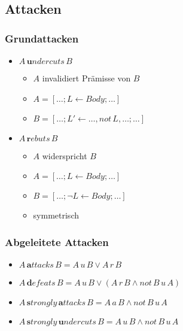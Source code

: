 \documentclass[nonacm=true, language=german]{acmart}
\newcommand{\attack}[3]{#1 \, #2 \, #3}
\renewcommand{\not}[1]{not \, #1}
\begin{document}
\subsection{Attacken}

\subsubsection{Grundattacken}

\begin{itemize}
    \item $ \attack{A}{\mathbf{u}ndercuts}{B} $
    \begin{itemize}
        \item $A$ invalidiert Prämisse von $B$
        \item $ A = [\dots; L \leftarrow Body; \dots] $
        \item $ B = [\dots; L' \leftarrow \dots, \not{L}, \dots; \dots] $
    \end{itemize}
    
    \item $ \attack{A}{\mathbf{r}ebuts}{B} $
    \begin{itemize}
        \item $A$ widerspricht $B$
        \item $ A = [\dots; L \leftarrow Body; \dots] $
        \item $ B = [\dots; \neg L \leftarrow Body; \dots] $
        \item symmetrisch
    \end{itemize}
\end{itemize}

\subsubsection{Abgeleitete Attacken}

\begin{itemize}
    \item $ \attack{A}{\mathbf{a}ttacks}{B} = \attack{A}{u}{B} \vee \attack{A}{r}{B} $
    \item $ \attack{A}{\mathbf{d}efeats}{B} = \attack{A}{u}{B} \vee (\attack{A}{r}{B} \wedge \not{\attack{B}{u}{A}}) $
    \item $ \attack{A}{\mathbf{s}trongly \, \mathbf{a}ttacks}{B} = \attack{A}{a}{B} \wedge \not{\attack{B}{u}{A}} $
    \item $ \attack{A}{\mathbf{s}trongly \, \mathbf{u}ndercuts}{B} = \attack{A}{u}{B} \wedge \not{\attack{B}{u}{A}} $
\end{itemize}
\end{document}
